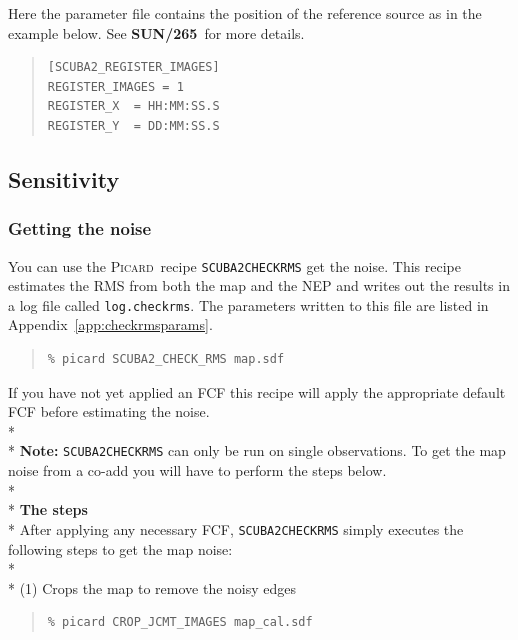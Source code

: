 \documentclass[twoside,11pt]{article}
\newcommand{\htmlref}[2]{#1}
\newcommand{\latexhtml}[2]{#1}
\newcommand{\xref}[3]{#1}
\newcommand{\xlabel}[1]{}
\renewcommand{\_}{\texttt{\symbol{95}}}
\newenvironment{myquote}{\begin{quote}\begin{small}}{\end{small}\end{quote}}
\newcommand{\picard}{\xref{\textsc{Picard}}{sun265}{}}
\newcommand{\drrecipe}[1]{\texttt{#1}}
\newcommand{\picardsun}{\xref{\textbf{SUN/265}}{sun265}{}}
\newcommand{\cref}[3]{\latexhtml{#1~\ref{#2}}{\htmlref{#3}{#2}}}
\begin{document}
Here the parameter file contains the position of the reference source
as in the example below. See \picardsun\ for more details.
\begin{center}
\begin{myquote}
\begin{verbatim}
[SCUBA2_REGISTER_IMAGES]
REGISTER_IMAGES = 1
REGISTER_X  = HH:MM:SS.S
REGISTER_Y  = DD:MM:SS.S
\end{verbatim}
\end{myquote}
\end{center}


\subsection{\xlabel{noise}Sensitivity}

\subsubsection{Getting the noise}
\label{sec:checkrms}

You can use the \picard\ recipe \drrecipe{SCUBA2\_CHECK\_RMS} get the
noise. This recipe estimates the RMS from both the map and the NEP and
writes out the results in a log file called \texttt{log.checkrms}. The
parameters written to this file are listed in
\cref{Appendix}{app:checkrmsparams}{SCUBA2_CHECK_RMS}.

\begin{myquote}
\begin{verbatim}
% picard SCUBA2_CHECK_RMS map.sdf
\end{verbatim}
\end{myquote}
If you have not yet applied an FCF this recipe will apply the
appropriate default FCF before estimating the noise.
\\*\\*
\textbf{Note:} \drrecipe{SCUBA2\_CHECK\_RMS} can only be run on single
observations. To get the map noise from a co-add you will have to
perform the steps below.
\\*\\*
\textbf{The steps}\\*
After applying any necessary FCF, \drrecipe{SCUBA2\_CHECK\_RMS} simply executes
the following steps to get the map noise:
\\*\\*
(1) Crops the map to remove the noisy edges
\begin{myquote}
\begin{verbatim}
% picard CROP_JCMT_IMAGES map_cal.sdf
\end{verbatim}
\end{myquote}
\end{document}
